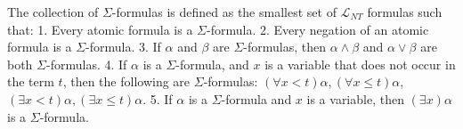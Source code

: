 The collection of $\Sigma$-formulas is defined as the smallest set of $\mathcal{L}_{N T}$ formulas such that:
1. Every atomic formula is a $\Sigma$-formula.
2. Every negation of an atomic formula is a $\Sigma$-formula.
3. If $\alpha$ and $\beta$ are $\Sigma$-formulas, then $\alpha \wedge \beta$ and $\alpha \vee \beta$ are both $\Sigma$-formulas.
4. If $\alpha$ is a $\Sigma$-formula, and $x$ is a variable that does not occur in the term $t$, then the following are $\Sigma$-formulas: $(\forall x<t) \alpha,(\forall x \leq t) \alpha$, $(\exists x<t) \alpha,(\exists x \leq t) \alpha$.
5. If $\alpha$ is a $\Sigma$-formula and $x$ is a variable, then $(\exists x) \alpha$ is a $\Sigma$-formula.
